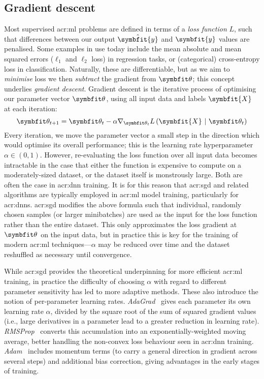\subsection{Gradient descent}
Most supervised \gls{acr:ml} problems are defined in terms of a \emph{loss function} $L$, such that differences between our output $\hat{\symbfit{y}}$ and $\symbfit{y}$ values are penalised.
Some examples in use today include the mean absolute and mean squared errors ($\ell_1$ and $\ell_2$ loss) in regression tasks, or (categorical) cross-entropy loss in classification.
Naturally, these are differentiable, but as we aim to \emph{minimise} loss we then \emph{subtract} the gradient from $\wvec{}$; this concept underlies \emph{gradient descent}.
Gradient descent is the iterative process of optimising our parameter vector $\wvec{}$, using all input data and labels $\symbfit{X}$ at each iteration:
\begin{equation}
	\wvec{t+1} = \wvec{t} - \alpha\nabla_{\wvec{t}}{L\left(\symbfit{X}~|~\wvec{t}\right)}
\end{equation}
Every iteration, we move the parameter vector a small step in the direction which would optimise its overall performance; this is the learning rate hyperparameter $\alpha\in\left(0,1\right)$.
However, re-evaluating the loss function over all input data becomes intractable in the case that either the function is expensive to compute on a moderately-sized dataset, or the dataset itself is monstrously large.
Both are often the case in \gls{acr:dnn} training.
It is for this reason that \gls{acr:sgd} and related algorithms are typically employed in \gls{acr:ml} model training, particularly for \glspl{acr:dnn}.
\gls{acr:sgd} modifies the above formula such that individual, randomly chosen samples (or larger minibatches) are used as the input for the loss function rather than the entire dataset.
This only approximates the loss gradient at $\wvec{}$ on the input data, but in practice this is key for the training of modern \gls{acr:ml} techniques---$\alpha$ may be reduced over time and the dataset reshuffled as necessary until convergence.

While \gls{acr:sgd} provides the theoretical underpinning for more efficient \gls{acr:ml} training, in practice the difficulty of choosing $\alpha$ with regard to different parameter sensitivity has led to more adaptive methods.
These also introduce the notion of per-parameter learning rates.
\emph{AdaGrad}~\parencite{DBLP:journals/jmlr/DuchiHS11} gives each parameter its own learning rate $\alpha$, divided by the square root of the sum of squared gradient values (i.e., large derivatives in a parameter lead to a greater reduction in learning rate).
\emph{RMSProp}~\parencite{rmsprop} converts this accumulation into an exponentially-weighted moving average, better handling the non-convex loss behaviour seen in \gls{acr:dnn} training.
\emph{Adam}~\parencite{DBLP:journals/corr/KingmaB14} includes momentum terms (to carry a general direction in gradient across several steps) and additional bias correction, giving advantages in the early stages of training.

